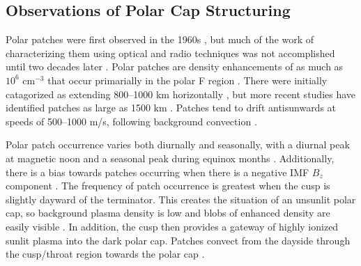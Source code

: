 


\subsection{Observations of Polar Cap Structuring}
\label{sec:lit_observations}
Polar patches were first observed in the 1960s \citep{Hill1963}, but much of the work of characterizing them using optical and radio techniques was not accomplished until two decades later \citep{Weber1981,Weber1984,Weber1986,Buchau1983,Buchau1985}.  Polar patches are density enhancements of as much as \(10^6\) cm\(^{-3}\) that occur primarially in the polar F region \citep{Buchau1983}.  There were initially catagorized as extending 800--1000 km horizontally \citep{Weber1984}, but more recent studies have identified patches as large as 1500 km \citep{Hosokawa2014}.  Patches tend to drift antisunwards at speeds of 500--1000 m/s, following background convection \citep{Buchau1983,Weber1984}.


Polar patch occurrence varies both diurnally and seasonally, with a diurnal peak at magnetic noon and a seasonal peak during equinox months \citep{Rodger1996}.  Additionally, there is a bias towards patches occurring when there is a negative IMF \(B_z\) component \citep{Buchau1983,Rodger1996}.  The frequency of patch occurrence is greatest when the cusp is slightly dayward of the terminator.  This creates the situation of an unsunlit polar cap, so background plasma density is low and blobs of enhanced density are easily visible \citep{Coley1998}.  In addition, the cusp then provides a gateway of highly ionized sunlit plasma into the dark polar cap.  Patches convect from the dayside through the cusp/throat region towards the polar cap \citep{Kelly1984,Foster1984,Foster1985,Foster1993,Sojka1982,delaBeaujardiere1985}. 

